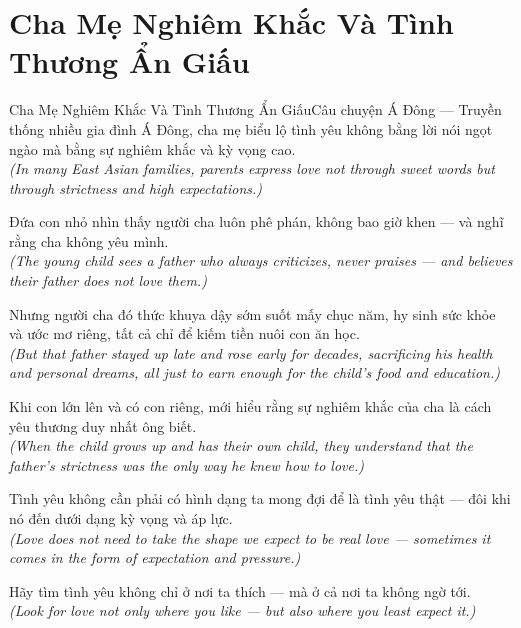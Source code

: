 \section{Cha Mẹ Nghiêm Khắc Và Tình Thương Ẩn Giấu}
\begin{truyen}{Cha Mẹ Nghiêm Khắc Và Tình Thương Ẩn Giấu}{Câu chuyện Á Đông --- Truyền thống}
 nhiều gia đình Á Đông, cha mẹ biểu lộ tình yêu không bằng lời nói ngọt ngào mà bằng sự nghiêm khắc và kỳ vọng cao.\\[4pt]
\textit{(In many East Asian families, parents express love not through sweet words but through strictness and high expectations.)}

Đứa con nhỏ nhìn thấy người cha luôn phê phán, không bao giờ khen --- và nghĩ rằng cha không yêu mình.\\[4pt]
\textit{(The young child sees a father who always criticizes, never praises --- and believes their father does not love them.)}

Nhưng người cha đó thức khuya dậy sớm suốt mấy chục năm, hy sinh sức khỏe và ước mơ riêng, tất cả chỉ để kiếm tiền nuôi con ăn học.\\[4pt]
\textit{(But that father stayed up late and rose early for decades, sacrificing his health and personal dreams, all just to earn enough for the child's food and education.)}

Khi con lớn lên và có con riêng, mới hiểu rằng sự nghiêm khắc của cha là cách yêu thương duy nhất ông biết.\\[4pt]
\textit{(When the child grows up and has their own child, they understand that the father's strictness was the only way he knew how to love.)}

Tình yêu không cần phải có hình dạng ta mong đợi để là tình yêu thật --- đôi khi nó đến dưới dạng kỳ vọng và áp lực.\\[4pt]
\textit{(Love does not need to take the shape we expect to be real love --- sometimes it comes in the form of expectation and pressure.)}

\end{truyen}
\begin{baihoc}
  Hãy tìm tình yêu không chỉ ở nơi ta thích --- mà ở cả nơi ta không ngờ tới.\\[4pt]
  \textit{(Look for love not only where you like --- but also where you least expect it.)}
\end{baihoc}

